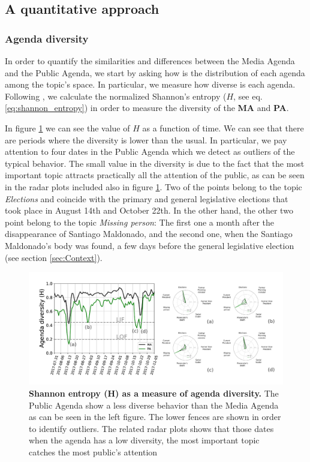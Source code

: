 \subsection{A quantitative approach}

\subsubsection{Agenda diversity}


\par In order to quantify the similarities and differences between the Media Agenda and the Public Agenda, we start by asking how is the distribution of each agenda among the topic's space. In particular, we measure how diverse is each agenda. Following \cite{boydstun2014importance}, we calculate the normalized Shannon's entropy ($H$, see eq.\ref{eq:shannon_entropy}) in order to measure the diversity of the \textbf{MA} and \textbf{PA}.
\par In figure \ref{fig:shannon_entropy_agendas} we can see the value of $H$ as a function of time. We can see that there are periods where the diversity is lower than the usual. In particular, we pay attention to four dates in the Public Agenda which we detect as outliers of the typical behavior. The small value in the diversity is due to the fact that the most important topic attracts practically all the attention of the public, as can be seen in the radar plots included also in figure \ref{fig:shannon_entropy_agendas}. 
Two of the points belong to the topic \emph{Elections} and coincide with the primary and general legislative elections that took place in August 14th and October 22th. In the other hand, the other two point belong to the topic \emph{Missing person}: The first one a month after the disappearance of Santiago Maldonado, and the second one, when the Santiago Maldonado's body was found, a few days before the general legislative election (see section \ref{sec:Context}).

\begin{figure}[h]
\centering
\includegraphics[width = \textwidth]{images/Fig3.pdf}
\caption{\textbf{Shannon entropy (H) as a measure of agenda diversity.} The Public Agenda show a less diverse behavior than the Media Agenda as can be seen in the left figure. The lower fences are shown in order to identify outliers. The related radar plots shows that those dates when the agenda has a low diversity, the most important topic catches the most public’s attention}
\label{fig:shannon_entropy_agendas}
\end{figure}

